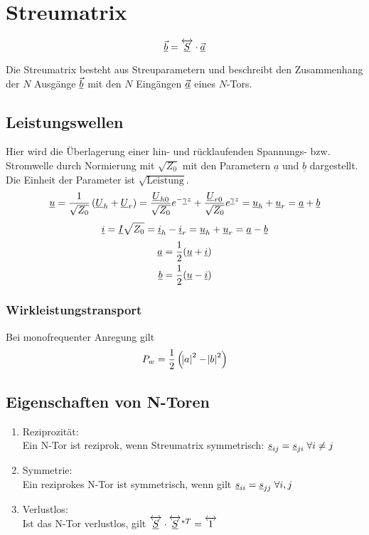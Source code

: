 \chapter{Streumatrix}

\begin{equation}
    \underline{\vec{b}} = \overleftrightarrow{\underline{S}} \cdot \underline{\vec{a}}
\end{equation}

Die Streumatrix besteht aus Streuparametern und beschreibt den Zusammenhang der $N$ Ausgänge $\underline{\vec{b}}$ mit
den $N$ Eingängen $\underline{\vec{a}}$ eines $N$-Tors.

\section{Leistungswellen}
Hier wird die Überlagerung einer hin- und rücklaufenden Spannungs- bzw. Stromwelle durch Normierung mit $\sqrt{Z_0}$ mit den Parametern $\underline{a}$ und $\underline{b}$ dargestellt. Die Einheit der Parameter ist $\sqrt{\text{Leistung}}$.
\begin{equation}
    \underline{u} = \frac{1}{\sqrt{Z_0}} \left( \underline{U}_h + \underline{U}_r \right) = \frac{\underline{U}_{h0}}{\sqrt{Z_0}} e^{-\underline{\gamma} z} + \frac{\underline{U}_{r0}}{\sqrt{Z_0}} e^{\underline{\gamma} z} = \underline{u}_h + \underline{u}_r = \underline{a} + \underline{b}
\end{equation}
\begin{equation}
    \underline{i} = \underline{I} \sqrt{Z_0} =  \underline{i}_h - \underline{i}_r = \underline{u}_h + \underline{u}_r = \underline{a} - \underline{b}
\end{equation}
\begin{align}
    \underline{a} &= \frac{1}{2} (\underline{u} + \underline{i})\\
    \underline{b} &= \frac{1}{2} (\underline{u} - \underline{i})
\end{align}

\subsection{Wirkleistungstransport}
Bei monofrequenter Anregung gilt
\begin{equation}
    P_w = \frac{1}{2} \left( \abs{a}^2 - \abs{b}^2 \right)
\end{equation}

\section{Eigenschaften von N-Toren}
\begin{enumerate}
    \item Reziprozität:\\
        Ein N-Tor ist reziprok, wenn Streumatrix symmetrisch: $\underline{s}_{ij} = \underline{s}_{ji} \;  \forall i\neq j$
    \item Symmetrie:\\
        Ein reziprokes N-Tor ist symmetrisch, wenn gilt $\underline{s}_{ii} = \underline{s}_{jj} \; \forall i,j$
    \item Verlustlos:\\
        Ist das N-Tor verlustlos, gilt $\overleftrightarrow{\underline{S}} \cdot \overleftrightarrow{\underline{S}} ^{*T} = \overleftrightarrow{1}$
\end{enumerate}

